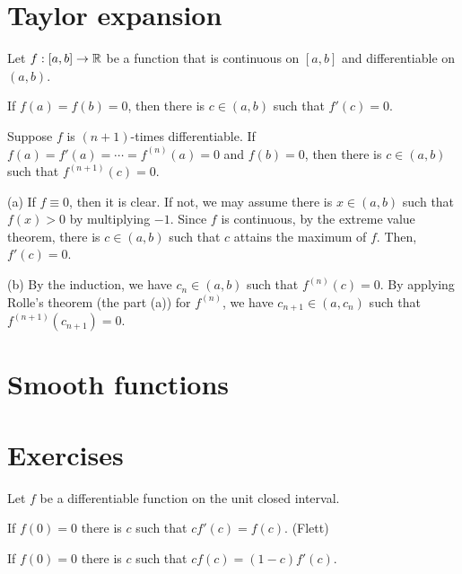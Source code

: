 \documentclass{../../large}
\begin{document}
\section{Taylor expansion}
\begin{prb}
Let $f:[a,b]\to\mathbb{R}$ be a function that is continuous on $[a,b]$ and differentiable on $(a,b)$.
\begin{parts}
\item If $f(a)=f(b)=0$, then there is $c\in(a,b)$ such that $f'(c)=0$.
\item Suppose $f$ is $(n+1)$-times differentiable. If $f(a)=f'(a)=\cdots=f^{(n)}(a)=0$ and $f(b)=0$, then there is $c\in(a,b)$ such that $f^{(n+1)}(c)=0$.
\end{parts}
\end{prb}
\begin{pf}
(a)
If $f\equiv0$, then it is clear.
If not, we may assume there is $x\in(a,b)$ such that $f(x)>0$ by multiplying $-1$.
Since $f$ is continuous, by the extreme value theorem, there is $c\in(a,b)$ such that $c$ attains the maximum of $f$.
Then, $f'(c)=0$.

(b)
By the induction, we have $c_n\in(a,b)$ such that $f^{(n)}(c)=0$.
By applying Rolle's theorem (the part (a)) for $f^{(n)}$, we have $c_{n+1}\in(a,c_n)$ such that $f^{(n+1)}(c_{n+1})=0$.
\end{pf}

\begin{prb}
\end{prb}


\section{Smooth functions}

\section*{Exercises}
\begin{prb}
Let $f$ be a differentiable function on the unit closed interval.
\begin{parts}
\item If $f(0)=0$ there is $c$ such that $cf'(c)=f(c)$. (Flett)
\item If $f(0)=0$ there is $c$ such that $cf(c)=(1-c)f'(c)$.
\end{parts}
\end{prb}
\begin{prb}
\end{prb}
\begin{prb}
\end{prb}
\end{document}
